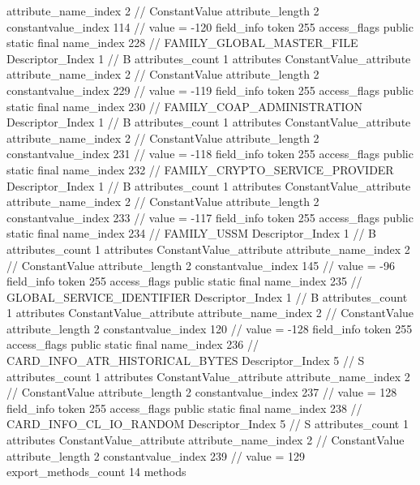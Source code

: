 {{{{{{{					attribute_name_index	2		// ConstantValue
					attribute_length	2
					constantvalue_index	114		// value = -120
				}
				}
			}
			field_info {
				token	255
				access_flags	public static final
				name_index	228		// FAMILY_GLOBAL_MASTER_FILE
				Descriptor_Index	1		// B
				attributes_count	1
				attributes {
				ConstantValue_attribute {
					attribute_name_index	2		// ConstantValue
					attribute_length	2
					constantvalue_index	229		// value = -119
				}
				}
			}
			field_info {
				token	255
				access_flags	public static final
				name_index	230		// FAMILY_COAP_ADMINISTRATION
				Descriptor_Index	1		// B
				attributes_count	1
				attributes {
				ConstantValue_attribute {
					attribute_name_index	2		// ConstantValue
					attribute_length	2
					constantvalue_index	231		// value = -118
				}
				}
			}
			field_info {
				token	255
				access_flags	public static final
				name_index	232		// FAMILY_CRYPTO_SERVICE_PROVIDER
				Descriptor_Index	1		// B
				attributes_count	1
				attributes {
				ConstantValue_attribute {
					attribute_name_index	2		// ConstantValue
					attribute_length	2
					constantvalue_index	233		// value = -117
				}
				}
			}
			field_info {
				token	255
				access_flags	public static final
				name_index	234		// FAMILY_USSM
				Descriptor_Index	1		// B
				attributes_count	1
				attributes {
				ConstantValue_attribute {
					attribute_name_index	2		// ConstantValue
					attribute_length	2
					constantvalue_index	145		// value = -96
				}
				}
			}
			field_info {
				token	255
				access_flags	public static final
				name_index	235		// GLOBAL_SERVICE_IDENTIFIER
				Descriptor_Index	1		// B
				attributes_count	1
				attributes {
				ConstantValue_attribute {
					attribute_name_index	2		// ConstantValue
					attribute_length	2
					constantvalue_index	120		// value = -128
				}
				}
			}
			field_info {
				token	255
				access_flags	public static final
				name_index	236		// CARD_INFO_ATR_HISTORICAL_BYTES
				Descriptor_Index	5		// S
				attributes_count	1
				attributes {
				ConstantValue_attribute {
					attribute_name_index	2		// ConstantValue
					attribute_length	2
					constantvalue_index	237		// value = 128
				}
				}
			}
			field_info {
				token	255
				access_flags	public static final
				name_index	238		// CARD_INFO_CL_IO_RANDOM
				Descriptor_Index	5		// S
				attributes_count	1
				attributes {
				ConstantValue_attribute {
					attribute_name_index	2		// ConstantValue
					attribute_length	2
					constantvalue_index	239		// value = 129
				}
				}
			}
			}
			export_methods_count	14
			methods {
}}}}
